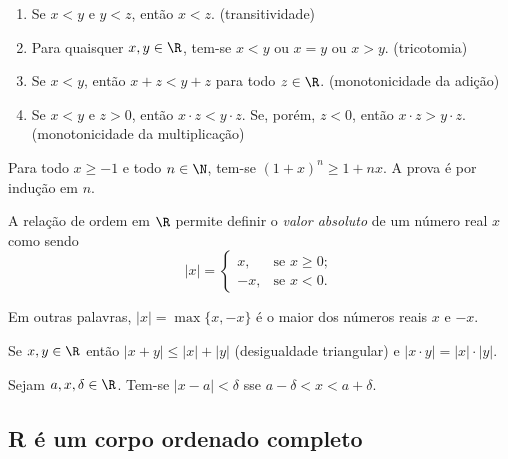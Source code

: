 \documentclass{article}
\begin{document}
\begin{prop} 
    \begin{enumerate}
        \item [\textbf{O1}] Se \(x<y\) e \(y<z\), então \(x<z\). \hfill (transitividade)
        \item [\textbf{O2}] Para quaisquer \(x, y \in \R\), tem-se \(x<y\) ou \(x=y\) ou \(x>y\). \hfill (tricotomia)
        \item [\textbf{O3}] Se \(x<y\), então \(x + z < y + z\) para todo \(z \in \R\). \hfill (monotonicidade da adição)
        \item [\textbf{O4}] Se \(x<y\) e \(z>0\), então \(x \cdot z < y \cdot z\). Se, porém, \(z<0\), então \(x \cdot z > y \cdot z\). \hfill (monotonicidade da multiplicação)
    \end{enumerate}
\end{prop}

\begin{exmp} 
    Para todo \(x \geq -1\) e todo \(n \in \N\), tem-se \((1 + x)^n \geq 1 + nx\). A prova é por indução em \(n\).
\end{exmp}

\begin{defn} 
    A relação de ordem em \(\R\) permite definir o \emph{valor absoluto} de um número real \(x\) como sendo \[|x| = \begin{cases}
        x, & \text{se } x \geq 0; \\
        -x, & \text{se } x < 0.
    \end{cases}\]

    Em outras palavras, \(|x| = \max\{x, -x\}\) é o maior dos números reais \(x\) e \(-x\).
\end{defn}

\begin{prop}
    Se \(x, y \in \R\) então \(|x+y| \leq |x| + |y|\) (desigualdade triangular) e \(|x \cdot y| = |x| \cdot |y|\).
\end{prop}

\begin{prop}
    Sejam \(a, x, \delta \in \R\). Tem-se \(|x - a| < \delta\) sse \(a - \delta < x < a + \delta\).
\end{prop}

\subsection{R é um corpo ordenado completo}
\end{document}
